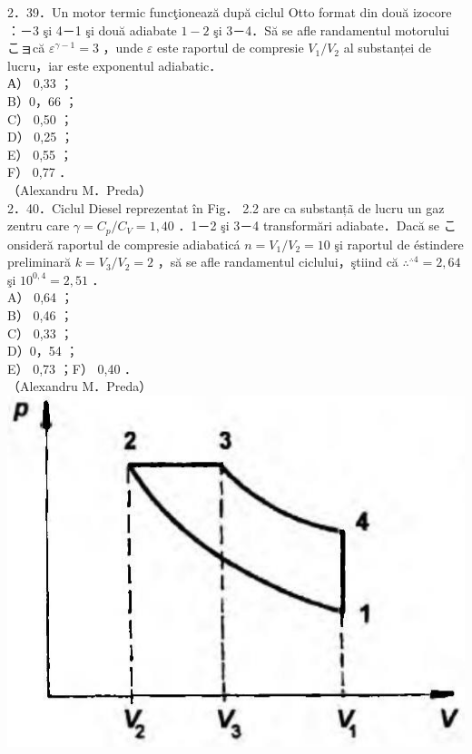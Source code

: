 \documentclass[10pt]{article}
\begin{document}
2．39．Un motor termic funcţionează după ciclul Otto format din două izocore ：－3 şi 4－1 şi două adiabate $1-2$ şi 3－4．Să se afle randamentul motorului こョcă $\varepsilon^{\gamma-1}=3$ ，unde $\varepsilon$ este raportul de compresie $V_{1} / V_{2}$ al substanței de lucru，iar este exponentul adiabatic．\\
А） 0,33 ；\\
B）0，66 ；\\
C） 0,50 ；\\
D） 0,25 ；\\
E） 0,55 ；\\
F） 0,77 ．\\
（Alexandru M．Preda）\\
2．40．Ciclul Diesel reprezentat în Fig． 2.2 are ca substanțã de lucru un gaz zentru care $\gamma=C_{p} / C_{V}=1,40$ ．1－2 şi 3－4 transformări adiabate．Dacă se こonsideră raportul de compresie adiabaticá $n=V_{1} / V_{2}=10$ şi raportul de éstindere preliminară $k=V_{3} / V_{2}=2$ ，să se afle randamentul ciclului，ştiind că $\therefore^{\therefore 4}=2,64$ şi $10^{0,4}=2,51$ ．\\
A） 0,64 ；\\
B） 0,46 ；\\
C） 0,33 ；\\
D）0，54 ；\\
E） 0,73 ；F） 0,40 ．\\
（Alexandru M．Preda）\\
\includegraphics[max width=\textwidth, center]{2025_07_01_5b3ff9fa0d508c8e9f17g-081}
\end{document}
